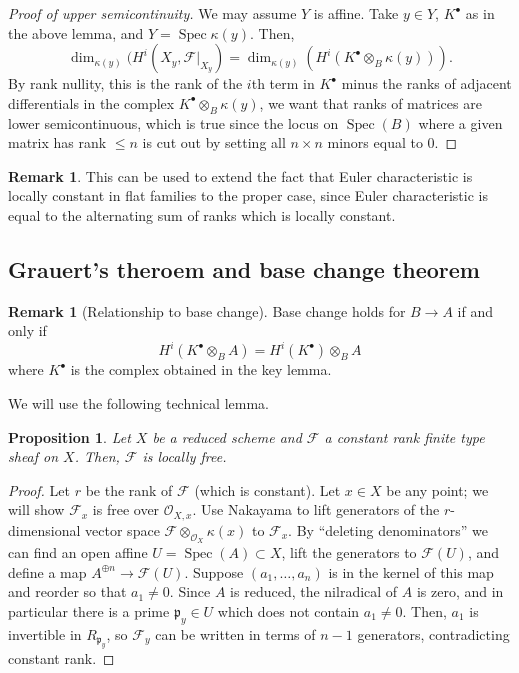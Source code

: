 \documentclass[10pt]{article}
\newtheorem{prop}[thm]{Proposition}
\theoremstyle{definition}
\newtheorem{rmk}[thm]{Remark}
\DeclareMathOperator{\Spec}{Spec}
\newcommand{\mf}{\mathfrak}
\newcommand{\OO}{\mathcal{O}}
\begin{document}
\begin{proof}[Proof of upper semicontinuity]
We may assume $Y$ is affine.  Take $y \in Y$, $K^\bullet$ as in the above lemma, and $Y = \Spec \kappa(y)$.  Then,
$$\dim_{\kappa(y)}(H^i(X_y, \mathcal{F}|_{X_y}) = \dim_{\kappa(y)}(H^i(K^\bullet \otimes_B \kappa(y))).$$
By rank nullity, this is the rank of the $i$th term in $K^\bullet$ minus the ranks of adjacent differentials in the complex $K^\bullet \otimes_B \kappa(y)$, we want that ranks of matrices are lower semicontinuous, which is true since the locus on $\Spec(B)$ where a given matrix has rank $\leq n$ is cut out by setting all $n \times n$ minors equal to $0$.
\end{proof}

\begin{rmk}
This can be used to extend the fact that Euler characteristic is locally constant in flat families to the proper case, since Euler characteristic is equal to the alternating sum of ranks which is locally constant.
\end{rmk}

\subsection{Grauert's theroem and base change theorem}


\begin{rmk}[Relationship to base change]
Base change holds for $B \rightarrow A$ if and only if $$H^i(K^\bullet \otimes_B A) = H^i(K^\bullet) \otimes_B A$$
where $K^\bullet$ is the complex obtained in the key lemma.
\end{rmk}

We will use the following technical lemma.
\begin{prop}
Let $X$ be a reduced scheme and $\mathcal{F}$ a constant rank finite type sheaf on $X$.  Then, $\mathcal{F}$ is locally free.
\end{prop}
\begin{proof}
Let $r$ be the rank of $\mathcal{F}$ (which is constant).  Let $x \in X$ be any point; we will show $\mathcal{F}_x$ is free over $\OO_{X, x}$.  Use Nakayama to lift generators of the $r$-dimensional vector space $\mathcal{F} \otimes_{\OO_X} \kappa(x)$ to $\mathcal{F}_x$.  By ``deleting denominators'' we can find an open affine $U = \Spec(A) \subset X$, lift the generators to $\mathcal{F}(U)$, and define a map $A^{\oplus n} \rightarrow \mathcal{F}(U)$.  Suppose $(a_1, \ldots, a_n)$ is in the kernel of this map and reorder so that $a_1 \ne 0$.  Since $A$ is reduced, the nilradical of $A$ is zero, and in particular there is a prime $\mf{p}_y \in U$ which does not contain $a_1 \ne 0$.  Then, $a_1$ is invertible in $R_{\mf{p}_{y}}$, so $\mathcal{F}_y$ can be written in terms of $n-1$ generators, contradicting constant rank.
\end{proof}
\end{document}

